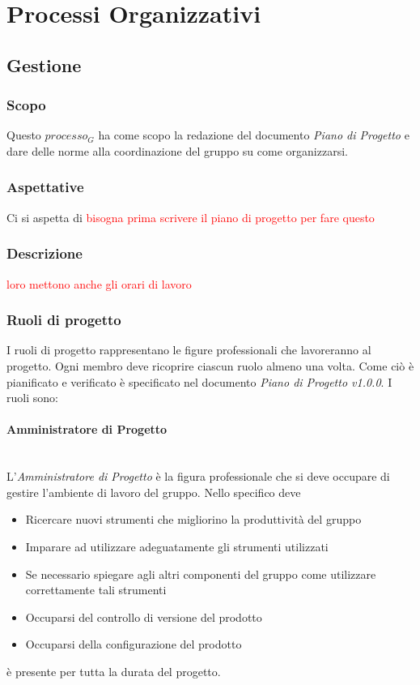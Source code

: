 \section{Processi Organizzativi}


\subsection{Gestione}

	\subsubsection{Scopo}
	Questo $processo_G$ ha come scopo la redazione del documento \emph{Piano di Progetto} e dare delle norme alla coordinazione del gruppo su come organizzarsi.
	\subsubsection{Aspettative}
	Ci si aspetta di \textcolor{red}{bisogna prima scrivere il piano di progetto per fare questo}
	\subsubsection{Descrizione} 
	\textcolor{red}{loro mettono anche gli orari di lavoro}
	\subsubsection{Ruoli di progetto} 
	I ruoli di progetto rappresentano le figure professionali che lavoreranno al progetto.  Ogni membro deve ricoprire ciascun ruolo almeno una volta. Come ciò è pianificato e verificato è specificato nel documento \emph{Piano di Progetto v1.0.0}. I ruoli sono:
		\paragraph{Amministratore di Progetto} \mbox{} \\
		L'\emph{Amministratore di Progetto} è la figura professionale che si deve occupare di gestire l'ambiente di lavoro del gruppo. Nello specifico deve
		\begin{itemize}
			\item Ricercare nuovi strumenti che migliorino la produttività del gruppo
			\item Imparare ad utilizzare adeguatamente gli strumenti utilizzati
			\item Se necessario spiegare agli altri componenti del gruppo come utilizzare correttamente tali strumenti
			\item Occuparsi del controllo di versione del prodotto 
			\item Occuparsi della configurazione del prodotto
		\end{itemize}
		è presente per tutta la durata del progetto.

